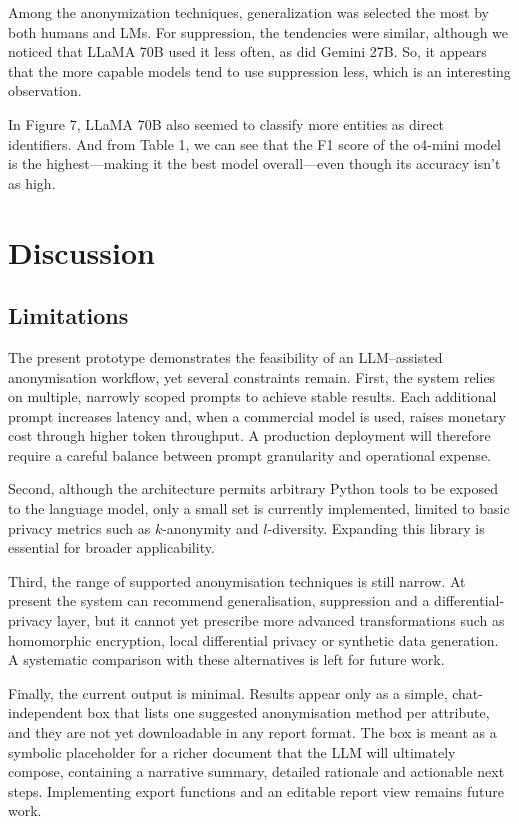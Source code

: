 \documentclass{article}
\begin{document}
Among the anonymization techniques, generalization was selected the most by both humans and LMs. For suppression, the tendencies were similar, although we noticed that LLaMA 70B used it less often, as did Gemini 27B. So, it appears that the more capable models tend to use suppression less, which is an interesting observation.

In Figure 7, LLaMA 70B also seemed to classify more entities as direct identifiers. And from Table 1, we can see that the F1 score of the o4-mini model is the highest—making it the best model overall—even though its accuracy isn’t as high.

\section{Discussion}
\subsection{Limitations}
\label{sec:limitations}

The present prototype demonstrates the feasibility of an LLM–assisted anonymisation workflow, yet several constraints remain.  
First, the system relies on multiple, narrowly scoped prompts to achieve stable results.  Each additional prompt increases latency and, when a commercial model is used, raises monetary cost through higher token throughput.  A production deployment will therefore require a careful balance between prompt granularity and operational expense.  

Second, although the architecture permits arbitrary Python tools to be exposed to the language model, only a small set is currently implemented, limited to basic privacy metrics such as $k$-anonymity and $l$-diversity.  Expanding this library is essential for broader applicability.  

Third, the range of supported anonymisation techniques is still narrow.  At present the system can recommend generalisation, suppression and a differential-privacy layer, but it cannot yet prescribe more advanced transformations such as homomorphic encryption, local differential privacy or synthetic data generation.  A systematic comparison with these alternatives is left for future work.  

Finally, the current output is minimal.  Results appear only as a simple, chat-independent box that lists one suggested anonymisation method per attribute, and they are not yet downloadable in any report format.  The box is meant as a symbolic placeholder for a richer document that the LLM will ultimately compose, containing a narrative summary, detailed rationale and actionable next steps.  Implementing export functions and an editable report view remains future work.
\end{document}
